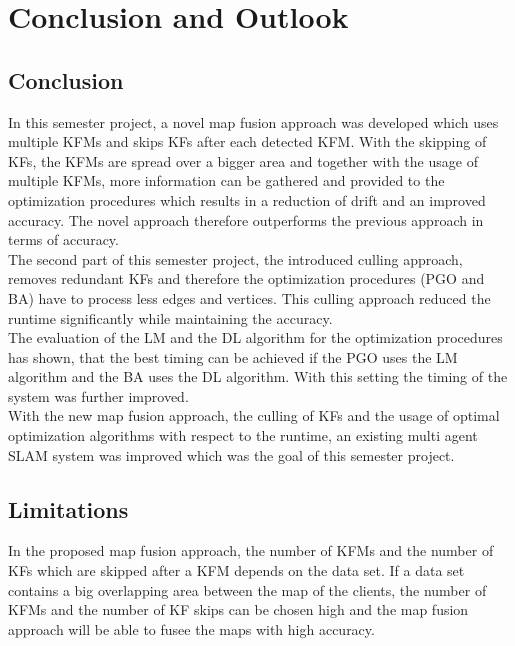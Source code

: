 \chapter{Conclusion and Outlook}

\section{Conclusion}
In this semester project, a novel map fusion approach was developed which uses multiple \acp{KFM} and skips \acp{KF} after each detected \ac{KFM}. With the skipping of \acp{KF}, the \acp{KFM} are spread over a bigger area and together with the usage of multiple \acp{KFM}, more information can be gathered and provided to the optimization procedures which results in a reduction of drift and an improved accuracy. The novel approach therefore outperforms the previous approach in terms of accuracy.\\

The second part of this semester project, the introduced culling approach, removes redundant \acp{KF} and therefore the optimization procedures (\ac{PGO} and \ac{BA}) have to process less edges and vertices. This culling approach reduced the runtime significantly while maintaining the accuracy.\\

The evaluation of the \ac{LM} and the \ac{DL} algorithm for the optimization procedures has shown, that the best timing can be achieved if the \ac{PGO} uses the \ac{LM} algorithm and the \ac{BA} uses the \ac{DL} algorithm. With this setting the timing of the system was further improved.\\

With the new map fusion approach, the culling of \acp{KF} and the usage of optimal optimization algorithms with respect to the runtime, an existing multi agent \ac{SLAM} system was improved which was the goal of this semester project.

\section{Limitations}
In the proposed map fusion approach, the number of \acp{KFM} and the number of \acp{KF} which are skipped after a \ac{KFM} depends on the data set. If a data set contains a big overlapping area between the map of the clients, the number of \acp{KFM} and the number of \ac{KF} skips can be chosen high and the map fusion approach will be able to fusee the maps with high accuracy.\\

